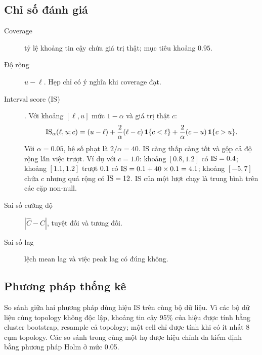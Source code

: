 \subsection{Chỉ số đánh giá}\label{sec:metric}
\begin{description}
  \item[Coverage] tỷ lệ khoảng tin cậy chứa giá trị thật; mục tiêu khoảng $0.95$.
  \item[Độ rộng] $u-\ell$. Hẹp chỉ có ý nghĩa khi coverage đạt.
  \item[Interval score (IS)] \citep{gneiting2007strictly}. Với khoảng $[\ell,u]$ mức $1-\alpha$ và giá trị thật $c$:
  \begin{equation}
  \mathrm{IS}_\alpha(\ell,u;c)=(u-\ell)+\frac{2}{\alpha}(\ell-c)\,\mathbf 1\{c<\ell\}+\frac{2}{\alpha}(c-u)\,\mathbf 1\{c>u\}.
  \end{equation}
  Với $\alpha=0.05$, hệ số phạt là $2/\alpha=40$. IS càng thấp càng tốt và gộp cả độ rộng lẫn việc trượt. Ví dụ với $c=1.0$: khoảng $[0.8,1.2]$ có $\mathrm{IS}=0.4$; khoảng $[1.1,1.2]$ trượt $0.1$ có $\mathrm{IS}=0.1+40\times0.1=4.1$; khoảng $[-5,7]$ chứa $c$ nhưng quá rộng có $\mathrm{IS}=12$. IS của một lượt chạy là trung bình trên các cặp non-null.
  \item[Sai số cường độ] $|\hat C-C|$, tuyệt đối và tương đối.
  \item[Sai số lag] lệch mean lag và việc peak lag có đúng không.
\end{description}

\subsection{Phương pháp thống kê}
So sánh giữa hai phương pháp dùng hiệu IS trên cùng bộ dữ liệu. Vì các bộ dữ liệu cùng topology không độc lập, khoảng tin cậy 95\% của hiệu được tính bằng cluster bootstrap, resample cả topology; một cell chỉ được tính khi có ít nhất 8 cụm topology. Các so sánh trong cùng một họ được hiệu chỉnh đa kiểm định bằng phương pháp Holm \citep{holm1979simple} ở mức 0.05.

